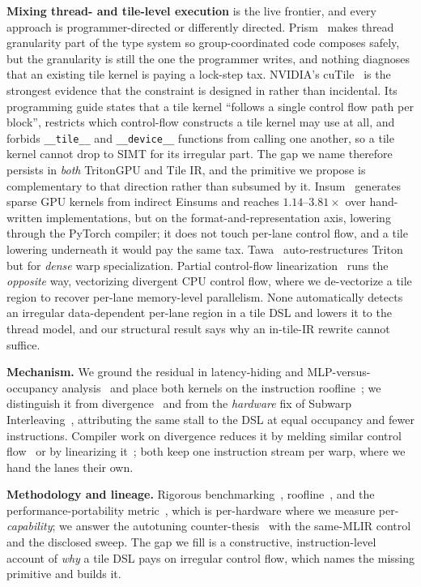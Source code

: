 \documentclass[sigplan,review,nonacm,10pt]{acmart}
\begin{document}
\textbf{Mixing thread- and tile-level execution} is the live frontier, and every approach
is programmer-directed or differently directed. Prism~\cite{prism2026} makes thread
granularity part of the type system so group-coordinated code composes safely, but the
granularity is still the one the programmer writes, and nothing diagnoses that an existing
tile kernel is paying a lock-step tax. NVIDIA's cuTile~\cite{cutile2025} is the strongest
evidence that the constraint is designed in rather than incidental. Its programming guide
states that a tile kernel ``follows a single control flow path per block'', restricts which
control-flow constructs a tile kernel may use at all, and forbids \texttt{\_\_tile\_\_}
and \texttt{\_\_device\_\_} functions from calling one another, so a tile kernel cannot
drop to SIMT for its irregular part. The gap we name therefore persists in \emph{both}
TritonGPU and Tile IR, and the primitive we propose is complementary to that direction
rather than subsumed by it. Insum~\cite{insum2026} generates sparse GPU kernels from
indirect Einsums and reaches $1.14$--$3.81\times$ over hand-written implementations, but on
the format-and-representation axis, lowering through the PyTorch compiler; it does not touch
per-lane control flow, and a tile lowering underneath it would pay the same tax. Tawa~\cite{tawa2026} auto-restructures Triton but for \emph{dense} warp
specialization. Partial control-flow linearization~\cite{partialcfg2018} runs the
\emph{opposite} way, vectorizing divergent CPU control flow, where we de-vectorize a tile
region to recover per-lane memory-level parallelism. None automatically detects an
irregular data-dependent per-lane region in a tile DSL and lowers it to the thread model,
and our structural result says why an in-tile-IR rewrite cannot suffice.

\textbf{Mechanism.} We ground the residual in latency-hiding and MLP-versus-occupancy
analysis~\cite{volkov2016latency,hongkim2009} and place both kernels on the instruction
roofline~\cite{instroofline2022}; we distinguish it from divergence~\cite{fung2007} and
from the \emph{hardware} fix of Subwarp Interleaving~\cite{subwarp2022}, attributing the
same stall to the DSL at equal occupancy and fewer instructions. Compiler work on
divergence reduces it by melding similar control flow~\cite{darm2022} or by linearizing
it~\cite{partialcfg2018}; both keep one instruction stream per warp, where we hand the
lanes their own.

\textbf{Methodology and lineage.} Rigorous benchmarking~\cite{hoefler2015},
roofline~\cite{roofline2009}, and the performance-portability metric~\cite{pennycook2016},
which is per-hardware where we measure per-\emph{capability}; we answer the autotuning
counter-thesis~\cite{ringlein2025} with the same-MLIR control and the disclosed sweep. The
gap we fill is a constructive, instruction-level account of \emph{why} a tile DSL pays on
irregular control flow, which names the missing primitive and builds it.
\end{document}
